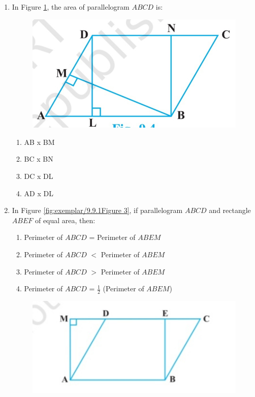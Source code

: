 \documentclass{article}
\begin{document}
\begin{enumerate}[label=\thesection.\arabic*,ref=\thesection.\theenumi]
\item In Figure \ref{fig:exemplar/9.9.1Figure 2}, the area of parallelogram $ABCD$ is:
\begin{figure}[!h]
\begin{center}
\includegraphics[width=\columnwidth]{exemplar/9.9.1/figs/four.jpg}
\caption{}
\label{fig:exemplar/9.9.1Figure 2}
\end{center}
\end{figure}
\begin{enumerate}
\item AB x BM
\item BC x BN
\item DC x DL
\item AD x DL
\end{enumerate}
\item In Figure \ref{fig:exemplar/9.9.1Figure 3}, if parallelogram $ABCD$ and rectangle $ABEF$ of equal area, then:
\begin{enumerate}
\item Perimeter of $ABCD$ = Perimeter of $ABEM$
\item Perimeter of $ABCD$ $<$ Perimeter of $ABEM$
\item Perimeter of $ABCD$ $>$ Perimeter of $ABEM$
\item Perimeter of $ABCD$ = $\frac{1}{2}$ (Perimeter of $ABEM$)
\end{enumerate}
\begin{figure}[!h]
\begin{center}
\includegraphics[width=\columnwidth]{exemplar/9.9.1/figs/five.jpg}

\end{center}
\end{figure}
\end{enumerate}
\end{document}
